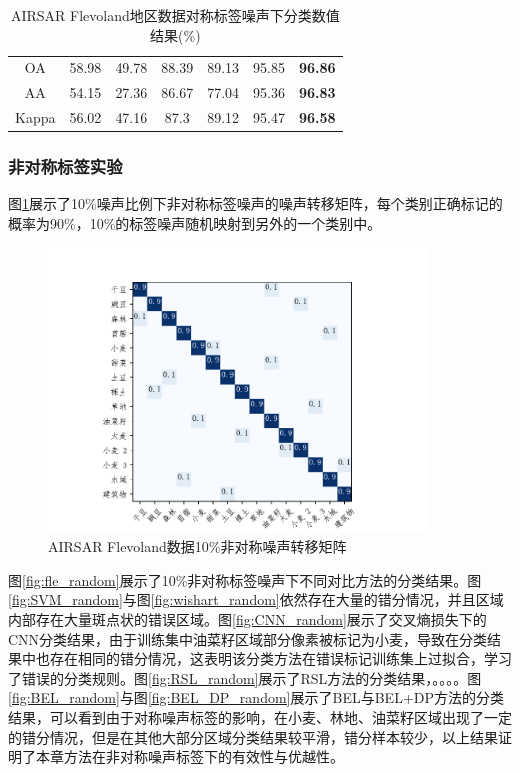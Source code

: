 \begin{table}[]
\begin{tabular}{cccccccc}
        \midrule[0.75bp]
        \multicolumn{2}{c}{OA}    & 58.98 & 49.78 & 88.39   & 89.13 & 95.85 & \textbf{96.86}                  \\
        \multicolumn{2}{c}{AA}    & 54.15 & 27.36 & 86.67   & 77.04 & 95.36 & \textbf{96.83}                  \\
        \multicolumn{2}{c}{Kappa} & 56.02 & 47.16 & 87.3    & 89.12 & 95.47 & \textbf{96.58}                  \\
        \bottomrule[1.5bp]
    \end{tabular}
    \caption{AIRSAR Flevoland地区数据对称标签噪声下分类数值结果(\%)}
    \label{tab:fle_res_4}
\end{table}

\subsubsection{非对称标签实验}
图\ref{fig:fle_noise_random}展示了10\%噪声比例下非对称标签噪声的噪声转移矩阵，每个类别正确标记的概率为90\%，10\%的标签噪声随机映射到另外的一个类别中。
\begin{figure}[ht!]
    \centering
    \includegraphics[width=10.04cm]{pic/chapter4/fle/noise_random.pdf}
    \caption{AIRSAR Flevoland数据10\%非对称噪声转移矩阵}
    \label{fig:fle_noise_random}
\end{figure}

图\ref{fig:fle_random}展示了10\%非对称标签噪声下不同对比方法的分类结果。图\ref{fig:SVM_random}与图\ref{fig:wishart_random}依然存在大量的错分情况，并且区域内部存在大量斑点状的错误区域。图\ref{fig:CNN_random}展示了交叉熵损失下的CNN分类结果，由于训练集中油菜籽区域部分像素被标记为小麦，导致在分类结果中也存在相同的错分情况，这表明该分类方法在错误标记训练集上过拟合，学习了错误的分类规则。图\ref{fig:RSL_random}展示了RSL方法的分类结果，。。。。图\ref{fig:BEL_random}与图\ref{fig:BEL_DP_random}展示了BEL与BEL+DP方法的分类结果，可以看到由于对称噪声标签的影响，在小麦、林地、油菜籽区域出现了一定的错分情况，但是在其他大部分区域分类结果较平滑，错分样本较少，以上结果证明了本章方法在非对称噪声标签下的有效性与优越性。

